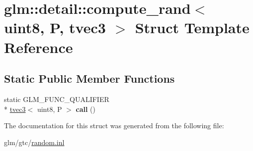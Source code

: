 \hypertarget{structglm_1_1detail_1_1compute__rand_3_01uint8_00_01P_00_01tvec3_01_4}{\section{glm\-:\-:detail\-:\-:compute\-\_\-rand$<$ uint8, P, tvec3 $>$ Struct Template Reference}
\label{structglm_1_1detail_1_1compute__rand_3_01uint8_00_01P_00_01tvec3_01_4}
}
\subsection*{Static Public Member Functions}
\begin{DoxyCompactItemize}
\item 
\hypertarget{structglm_1_1detail_1_1compute__rand_3_01uint8_00_01P_00_01tvec3_01_4_a6c86825a493fcef72cb61f2ed94a2b52}{static G\-L\-M\-\_\-\-F\-U\-N\-C\-\_\-\-Q\-U\-A\-L\-I\-F\-I\-E\-R \\*
\hyperlink{structglm_1_1tvec3}{tvec3}$<$ uint8, P $>$ {\bfseries call} ()}\label{structglm_1_1detail_1_1compute__rand_3_01uint8_00_01P_00_01tvec3_01_4_a6c86825a493fcef72cb61f2ed94a2b52}

\end{DoxyCompactItemize}


The documentation for this struct was generated from the following file\-:\begin{DoxyCompactItemize}
\item 
glm/gtc/\hyperlink{random_8inl}{random.\-inl}\end{DoxyCompactItemize}
